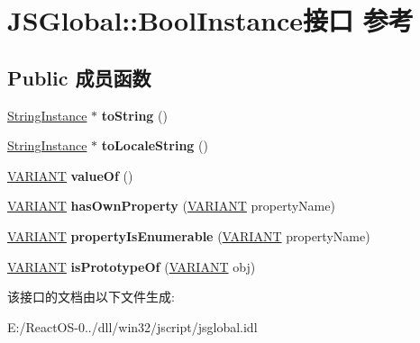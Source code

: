 \hypertarget{interface_j_s_global_1_1_bool_instance}{}\section{J\+S\+Global\+:\+:Bool\+Instance接口 参考}
\label{interface_j_s_global_1_1_bool_instance}
\subsection*{Public 成员函数}
\begin{DoxyCompactItemize}
\item 
\mbox{\label{interface_j_s_global_1_1_bool_instance_a2dc22c3212c3992143641ddb9ef152ab}} 
\hyperlink{interface_j_s_global_1_1_string_instance}{String\+Instance} $\ast$ {\bfseries to\+String} ()
\item 
\mbox{\label{interface_j_s_global_1_1_bool_instance_a7dc72e19f1556466ffe70e99b6134a2f}} 
\hyperlink{interface_j_s_global_1_1_string_instance}{String\+Instance} $\ast$ {\bfseries to\+Locale\+String} ()
\item 
\mbox{\label{interface_j_s_global_1_1_bool_instance_a4ab7722f844b1902f217888427b09d4e}} 
\hyperlink{structtag_v_a_r_i_a_n_t}{V\+A\+R\+I\+A\+NT} {\bfseries value\+Of} ()
\item 
\mbox{\label{interface_j_s_global_1_1_bool_instance_ac33f240a6ae8ee872d96741739a29b4c}} 
\hyperlink{structtag_v_a_r_i_a_n_t}{V\+A\+R\+I\+A\+NT} {\bfseries has\+Own\+Property} (\hyperlink{structtag_v_a_r_i_a_n_t}{V\+A\+R\+I\+A\+NT} property\+Name)
\item 
\mbox{\label{interface_j_s_global_1_1_bool_instance_acc57e7b19c4f0b8e4da32fdb9c141ded}} 
\hyperlink{structtag_v_a_r_i_a_n_t}{V\+A\+R\+I\+A\+NT} {\bfseries property\+Is\+Enumerable} (\hyperlink{structtag_v_a_r_i_a_n_t}{V\+A\+R\+I\+A\+NT} property\+Name)
\item 
\mbox{\label{interface_j_s_global_1_1_bool_instance_a3e56c2f3126edbd288598534aa241c37}} 
\hyperlink{structtag_v_a_r_i_a_n_t}{V\+A\+R\+I\+A\+NT} {\bfseries is\+Prototype\+Of} (\hyperlink{structtag_v_a_r_i_a_n_t}{V\+A\+R\+I\+A\+NT} obj)
\end{DoxyCompactItemize}


该接口的文档由以下文件生成\+:\begin{DoxyCompactItemize}
\item 
E\+:/\+React\+O\+S-\/0../dll/win32/jscript/jsglobal.\+idl\end{DoxyCompactItemize}
